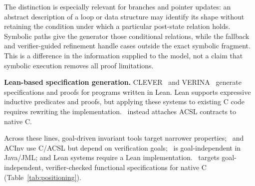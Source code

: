 The distinction is especially relevant for branches and pointer updates:
an abstract description of a loop or data structure may identify its shape
without retaining the condition under which a particular post-state relation
holds. Symbolic paths give the generator those conditional relations, while
the fallback and verifier-guided refinement handle cases outside the exact
symbolic fragment. This is a difference in the information supplied to the
model, not a claim that symbolic execution removes all proof limitations.

\smallskip
\noindent\textbf{Lean-based specification generation.}
CLEVER~\cite{thakur2025clever} and VERINA~\cite{ye2026verina} generate specifications and proofs for programs written in Lean. Lean supports expressive inductive predicates and proofs, but applying these systems to existing C code requires rewriting the implementation. \toolname\ instead attaches ACSL contracts to native C.

\smallskip
\noindent Across these lines, goal-driven invariant tools target narrower properties; \autospec\ and ACInv use C/ACSL but depend on verification goals; \specgen\ is goal-independent in Java/JML; and Lean systems require a Lean implementation. \toolname\ targets goal-independent, verifier-checked functional specifications for native C (Table~\ref{tab:positioning}).
